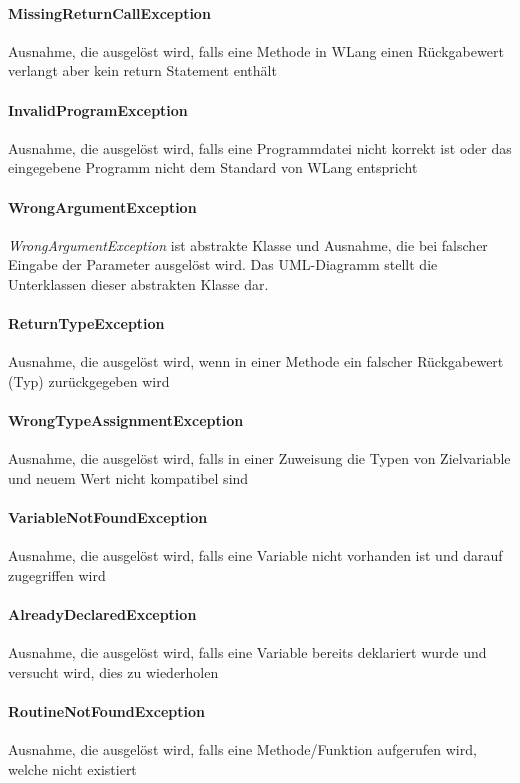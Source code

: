 \documentclass[parskip=full]{scrartcl}
\begin{document}
\paragraph{MissingReturnCallException}
Ausnahme, die ausgelöst wird, falls eine Methode in WLang einen Rückgabewert verlangt aber kein return Statement enthält
\paragraph{InvalidProgramException}
Ausnahme, die ausgelöst wird, falls eine Programmdatei nicht korrekt ist oder das eingegebene Programm nicht dem Standard von WLang entspricht
\paragraph{WrongArgumentException}
\textit{WrongArgumentException} ist abstrakte Klasse und Ausnahme, die bei falscher Eingabe der Parameter ausgelöst wird. Das UML-Diagramm stellt die Unterklassen dieser abstrakten Klasse dar.
\paragraph{ReturnTypeException}
Ausnahme, die ausgelöst wird, wenn in einer Methode ein falscher Rückgabewert (Typ) zurückgegeben wird
\paragraph{WrongTypeAssignmentException}
Ausnahme, die ausgelöst wird, falls in einer Zuweisung die Typen von Zielvariable und neuem Wert nicht kompatibel sind
\paragraph{VariableNotFoundException}
Ausnahme, die ausgelöst wird, falls eine Variable nicht vorhanden ist und darauf zugegriffen wird
\paragraph{AlreadyDeclaredException}
Ausnahme, die ausgelöst wird, falls eine Variable bereits deklariert wurde und versucht wird, dies zu wiederholen
\paragraph{RoutineNotFoundException}
Ausnahme, die ausgelöst wird, falls eine Methode/Funktion aufgerufen wird, welche nicht existiert
\end{document}
